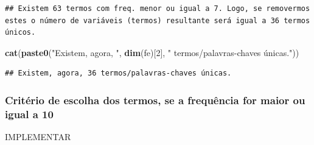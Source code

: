 \documentclass[]{article}
\newenvironment{Shaded}{\begin{snugshade}}{\end{snugshade}}
\newcommand{\DecValTok}[1]{\textcolor[rgb]{0.00,0.00,0.81}{#1}}
\newcommand{\KeywordTok}[1]{\textcolor[rgb]{0.13,0.29,0.53}{\textbf{#1}}}
\newcommand{\NormalTok}[1]{#1}
\newcommand{\OperatorTok}[1]{\textcolor[rgb]{0.81,0.36,0.00}{\textbf{#1}}}
\newcommand{\StringTok}[1]{\textcolor[rgb]{0.31,0.60,0.02}{#1}}
\begin{document}
\begin{verbatim}
## Existem 63 termos com freq. menor ou igual a 7. Logo, se removermos estes o número de variáveis (termos) resultante será igual a 36 termos únicos.
\end{verbatim}

\begin{Shaded}
\end{Shaded}

\begin{Shaded}
\begin{Highlighting}[]
\KeywordTok{cat}\NormalTok{(}\KeywordTok{paste0}\NormalTok{(}\StringTok{"Existem, agora, "}\NormalTok{, }\KeywordTok{dim}\NormalTok{(fe)[}\DecValTok{2}\NormalTok{], }\StringTok{" termos/palavras-chaves únicas."}\NormalTok{))}
\end{Highlighting}
\end{Shaded}

\begin{verbatim}
## Existem, agora, 36 termos/palavras-chaves únicas.
\end{verbatim}

\hypertarget{criterio-de-escolha-dos-termos-se-a-frequencia-for-maior-ou-igual-a-10}{%
\subsubsection{Critério de escolha dos termos, se a frequência for maior
ou igual a
10}\label{criterio-de-escolha-dos-termos-se-a-frequencia-for-maior-ou-igual-a-10}}

IMPLEMENTAR
\end{document}
